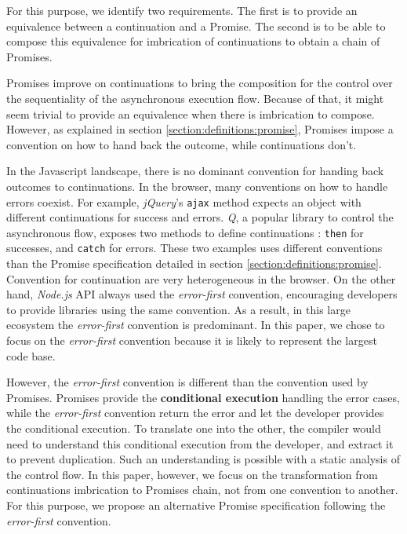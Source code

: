 For this purpose, we identify two requirements.
The first is to provide an equivalence between a continuation and a Promise.
The second is to be able to compose this equivalence for imbrication of continuations to obtain a chain of Promises.

Promises improve on continuations to bring the composition for the control over the sequentiality of the asynchronous execution flow.
Because of that, it might seem trivial to provide an equivalence when there is imbrication to compose.
However, as explained in section \ref{section:definitions:promise}, Promises impose a convention on how to hand back the outcome, while continuations don't.

In the Javascript landscape, there is no dominant convention for handing back outcomes to continuations.
In the browser, many conventions on how to handle errors coexist.
For example, \textit{jQuery}'s \texttt{ajax} method expects an object with different continuations for success and errors.
\textit{Q}, a popular library to control the asynchronous flow, exposes two methods to define continuations : \texttt{then} for successes, and \texttt{catch} for errors.
These two examples uses different conventions than the Promise specification detailed in section \ref{section:definitions:promise}.
Convention for continuation are very heterogeneous in the browser.
On the other hand, \textit{Node.js} API always used the \textit{error-first} convention, encouraging developers to provide libraries using the same convention.
As a result, in this large ecosystem the \textit{error-first} convention is predominant.
In this paper, we chose to focus on the \textit{error-first} convention because it is likely to represent the largest code base.

However, the \textit{error-first} convention is different than the convention used by Promises.
Promises provide the \textbf{conditional execution} handling the error cases, while the \textit{error-first} convention return the error and let the developer provides the conditional execution.
To translate one into the other, the compiler would need to understand this conditional execution from the developer, and extract it to prevent duplication.
Such an understanding is possible with a static analysis of the control flow. 
In this paper, however, we focus on the transformation from continuations imbrication to Promises chain, not from one convention to another.
For this purpose, we propose an alternative Promise specification following the \textit{error-first} convention.

